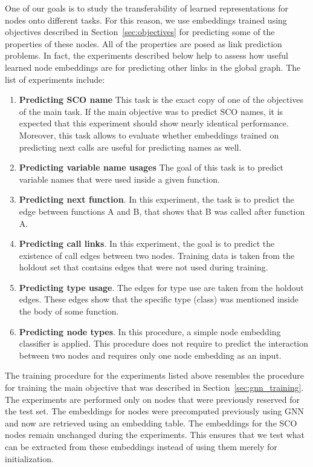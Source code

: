\documentclass[a4paper,twoside]{article}
\begin{document}
One of our goals is to study the transferability of learned representations for nodes onto different tasks. For this reason, we use embeddings trained using objectives described in Section~\ref{sec:objectives} for predicting some of the properties of these nodes. All of the properties are posed as link prediction problems. In fact, the experiments described below help to assess how useful learned node embeddings are for predicting other links in the global graph. The list of experiments include:
\begin{enumerate}
    \item \textbf{Predicting SCO name} 
    This task is the exact copy of one of the objectives of the main task. If the main objective was to predict SCO names, it is expected that this experiment should show nearly identical performance. Moreover, this task allows to evaluate whether embeddings trained on predicting next calls are useful for predicting names as well. 
    \item \textbf{Predicting variable name usages}
    The goal of this task is to predict variable names that were used inside a given function.
    \item \textbf{Predicting next function}.
    In this experiment, the task is to predict the edge between functions A and B, that shows that B was called after function A. 
    \item \textbf{Predicting call links}. 
    In this experiment, the goal is to predict the existence of call edges between two nodes. Training data is taken from the holdout set that contains edges that were not used during training. 
    \item \textbf{Predicting type usage}.
    The edges for type use are taken from the holdout edges. These edges show that the specific type (class) was mentioned inside the body of some function. 
    \item \textbf{Predicting node types}.
    In this procedure, a simple node embedding classifier is applied. This procedure does not require to predict the interaction between two nodes and requires only one node embedding as an input. 
\end{enumerate}

The training procedure for the experiments listed above resembles the procedure for training the main objective that was described in Section~\ref{sec:gnn_training}. The experiments are performed only on nodes that were previously reserved for the test set. The embeddings for nodes were precomputed previously using GNN and now are retrieved using an embedding table. The embeddings for the SCO nodes remain unchanged during the experiments. This ensures that we test what can be extracted from these embeddings instead of using them merely for initialization. 
\end{document}
